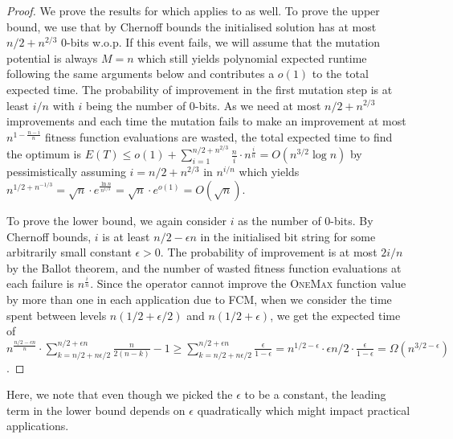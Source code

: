 \documentclass[lettersize,journal]{IEEEtran}
\begin{document}
\begin{proof}
We prove the results for \expoF{} which applies to \expoHD{} as well. 
To prove the upper bound, we use that by Chernoff bounds the initialised solution has at most $n/2+ n^{2/3}$ 0-bits w.o.p. {\color{black} If this event fails, we will assume that the mutation potential is always $M=n$ which still yields polynomial expected runtime following the same arguments below and contributes a $o(1)$ to the total expected time}. The probability of improvement in the first mutation step is at least $i/n$ with $i$ being the number of 0-bits. As we need at most $n/2+n^{2/3}$ improvements and each time the mutation fails to make an improvement at most $n^{1-\frac{n-i}{n}}$ fitness function evaluations are wasted, the total expected time to find the optimum is $E(T) \leq o(1) + \sum_{i=1}^{n/2+n^{2/3}} \frac{n}{i} \cdot n^{\frac{i}{n}}= O (n^{3/2} \log n)$ by pessimistically assuming $i=n/2+n^{2/3}$ in $n^{i/n}$ {\color{black} which yields $n^{1/2+n^{-1/3}}=\sqrt{n} \cdot e^{\frac{\ln n}{n^{1/3}}}=\sqrt{n} \cdot e^{o(1)}=O(\sqrt{n})$}.

To prove the lower bound, we again consider $i$ as the number of 0-bits. By Chernoff 
bounds, $i$ is at least $n/2-\epsilon n$  in the initialised bit string for some arbitrarily small constant $\epsilon>0$. 
The probability of improvement is at most $2i/n$ by the Ballot theorem, and the number of wasted fitness function evaluations at each failure is 
$n^{\frac{i}{n}}$. {\color{black} Since the operator cannot improve the \textsc{OneMax} function value by more than one in each application due to FCM,} when we consider the time spent between levels $n(1/2 + 
\epsilon/2)$ and $n(1/2+\epsilon)$, we get the expected time of 
{\color{black}$n^{\frac{n/2-\epsilon n}{n}} \cdot \sum_{k=n/2+n\epsilon/2 }^{n/2+\epsilon 
n} \frac{n}{2(n-k)}-1 \geq \sum_{k=n/2+n\epsilon/2 }^{n/2+\epsilon 
n} \frac{\epsilon}{1-\epsilon}=n^{1/2-\epsilon} \cdot \epsilon n/2 \cdot \frac{\epsilon}{1-\epsilon}= 
\Omega(n^{3/2-\epsilon})$.}
\end{proof}

{\color{black}Here, we note that even though we picked the $\epsilon$ to be a constant, the leading term in the lower bound depends on $\epsilon$ quadratically which might impact practical applications.}



\end{document}
